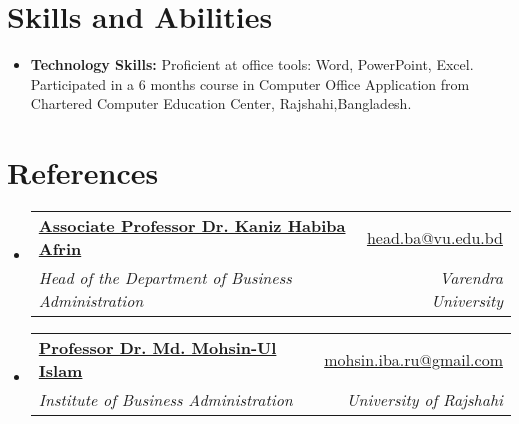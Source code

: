 \documentclass[a4paper,11pt]{article}
\makeatletter
\newcommand{\resumeSubheading}[4]{
    \vspace{-1pt}\item
    \begin{tabular*}{0.97\textwidth}{l@{\extracolsep{\fill}}r}
        \textbf{#1}       & #2                 \\
        \textit{\small#3} & \textit{\small #4} \\
    \end{tabular*}\vspace{-5pt}
}
\newcommand{\resumeSubHeadingListStart}{\begin{itemize}[leftmargin=*]}
\newcommand{\resumeSubHeadingListEnd}{\end{itemize}}
\makeatother
\begin{document}

\section{Skills and Abilities}
\resumeSubHeadingListStart
\item{ \textbf{Technology Skills: }{Proficient at office tools: Word, PowerPoint, Excel. Participated in a 6 months course in Computer Office Application 
from Chartered Computer Education Center, Rajshahi,Bangladesh.}}

\resumeSubHeadingListEnd

\section{References}
\resumeSubHeadingListStart


\resumeSubheading
{\href{}{Associate Professor Dr. Kaniz Habiba Afrin}}
{ \href{head.ba@vu.edu.bd}{head.ba@vu.edu.bd}}
{Head of the Department of Business Administration}{Varendra University}

\resumeSubheading
{\href{}{Professor Dr. Md. Mohsin-Ul Islam }}
{ \href{head.ba@vu.edu.bd}{mohsin.iba.ru@gmail.com}}
{Institute of Business Administration}{University of Rajshahi}


\resumeSubHeadingListEnd
\end{document}

